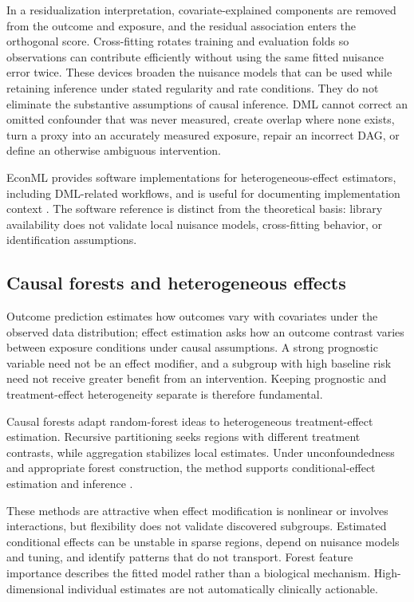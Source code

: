 In a residualization interpretation, covariate-explained components are removed from the outcome and exposure, and the residual association enters the orthogonal score.  Cross-fitting rotates training and evaluation folds so observations can contribute efficiently without using the same fitted nuisance error twice.  These devices broaden the nuisance models that can be used while retaining inference under stated regularity and rate conditions.  They do not eliminate the substantive assumptions of causal inference.  DML cannot correct an omitted confounder that was never measured, create overlap where none exists, turn a proxy into an accurately measured exposure, repair an incorrect DAG, or define an otherwise ambiguous intervention.

EconML provides software implementations for heterogeneous-effect estimators, including DML-related workflows, and is useful for documenting implementation context \cite{oprescu_et_al_2019_econml}.  The software reference is distinct from the theoretical basis: library availability does not validate local nuisance models, cross-fitting behavior, or identification assumptions.

\subsection{Causal forests and heterogeneous effects}

Outcome prediction estimates how outcomes vary with covariates under the observed data distribution; effect estimation asks how an outcome contrast varies between exposure conditions under causal assumptions.  A strong prognostic variable need not be an effect modifier, and a subgroup with high baseline risk need not receive greater benefit from an intervention.  Keeping prognostic and treatment-effect heterogeneity separate is therefore fundamental.

Causal forests adapt random-forest ideas to heterogeneous treatment-effect estimation.  Recursive partitioning seeks regions with different treatment contrasts, while aggregation stabilizes local estimates.  Under unconfoundedness and appropriate forest construction, the method supports conditional-effect estimation and inference \cite{wager2018causalforest}.

These methods are attractive when effect modification is nonlinear or involves interactions, but flexibility does not validate discovered subgroups.  Estimated conditional effects can be unstable in sparse regions, depend on nuisance models and tuning, and identify patterns that do not transport.  Forest feature importance describes the fitted model rather than a biological mechanism.  High-dimensional individual estimates are not automatically clinically actionable.


